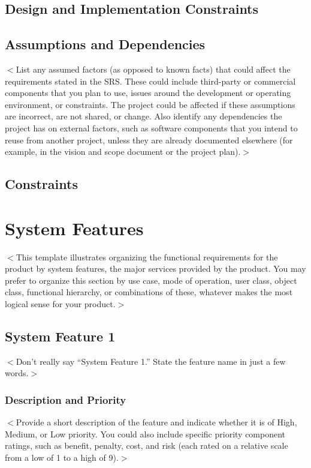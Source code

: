 \documentclass{scrreprt}
\begin{document}
\section{Design and Implementation Constraints}

\section{Assumptions and Dependencies}

$<$List any assumed factors (as opposed to known facts) that could affect the 
requirements stated in the SRS. These could include third-party or commercial 
components that you plan to use, issues around the development or operating 
environment, or constraints. The project could be affected if these assumptions 
are incorrect, are not shared, or change. Also identify any dependencies the 
project has on external factors, such as software components that you intend to 
reuse from another project, unless they are already documented elsewhere (for 
example, in the vision and scope document or the project plan).$>$

\section{Constraints}


\chapter{System Features}
$<$This template illustrates organizing the functional requirements for the 
product by system features, the major services provided by the product. You may 
prefer to organize this section by use case, mode of operation, user class, 
object class, functional hierarchy, or combinations of these, whatever makes the 
most logical sense for your product.$>$

\section{System Feature 1}
$<$Don’t really say “System Feature 1.” State the feature name in just a few 
words.$>$

\subsection{Description and Priority}
$<$Provide a short description of the feature and indicate whether it is of 
High, Medium, or Low priority. You could also include specific priority 
component ratings, such as benefit, penalty, cost, and risk (each rated on a 
relative scale from a low of 1 to a high of 9).$>$
\end{document}
